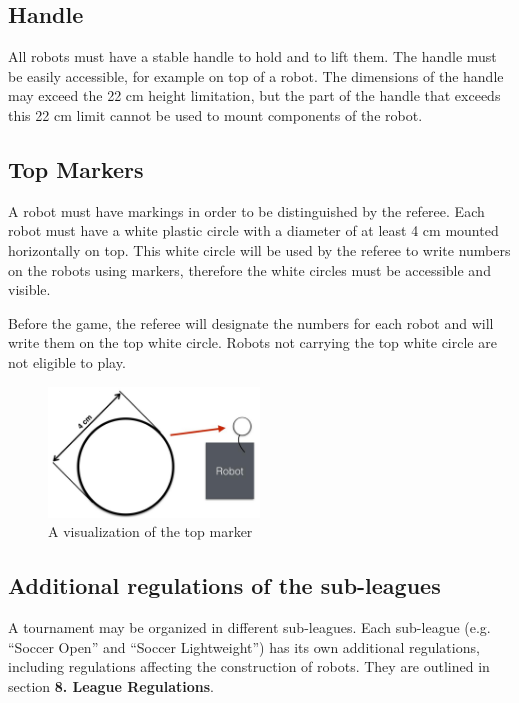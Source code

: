 \documentclass{article}
\begin{document}
\subsection{ Handle \label{ref-024}}

All robots must have a stable handle to hold and to lift them. The handle must
be easily accessible, for example on top of a robot. The dimensions of the
handle may exceed the 22 cm height limitation, but the part of the handle that
exceeds this 22 cm limit cannot be used to mount components of the robot.

\subsection{ Top Markers\label{ref-025}}

A robot must have markings in order to be distinguished by the referee. Each
robot must have a white plastic circle with a diameter of at least 4 cm mounted
horizontally on top. This white circle will be used by the referee to write
numbers on the robots using markers, therefore the white circles must be
accessible and visible.

Before the game, the referee will designate the numbers for each robot and will
write them on the top white circle. Robots not carrying the top white circle
are not eligible to play.

\begin{figure}[H]
    \centering
    \includegraphics[width=0.5\textwidth]{media/image4.jpeg}
    \caption{A visualization of the top marker}
    \label{fig:top_marker}
\end{figure}

\subsection{ Additional regulations of the sub-leagues \label{ref-026}}

A tournament may be organized in different sub-leagues. Each sub-league (e.g.
``Soccer Open'' and ``Soccer Lightweight'') has its own additional regulations,
including regulations affecting the construction of robots. They are outlined
in section \textbf{8. League Regulations}.
\end{document}
